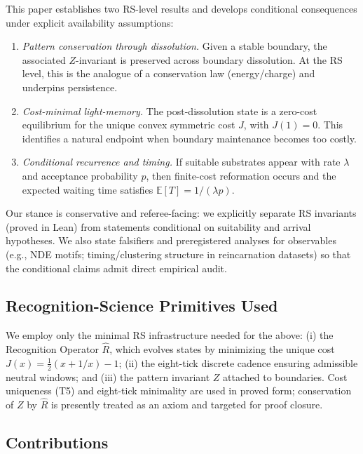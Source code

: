 \documentclass[11pt,letterpaper]{article}
\theoremstyle{definition}
\theoremstyle{remark}
\begin{document}
This paper establishes two RS-level results and develops conditional consequences under explicit availability assumptions:
\begin{enumerate}
  \item \emph{Pattern conservation through dissolution.} Given a stable boundary, the associated \(Z\)-invariant is preserved across boundary dissolution. At the RS level, this is the analogue of a conservation law (energy/charge) and underpins persistence.
  \item \emph{Cost-minimal light-memory.} The post-dissolution state is a zero-cost equilibrium for the unique convex symmetric cost \(J\), with \(J(1)=0\). This identifies a natural endpoint when boundary maintenance becomes too costly.
  \item \emph{Conditional recurrence and timing.} If suitable substrates appear with rate \(\lambda\) and acceptance probability \(p\), then finite-cost reformation occurs and the expected waiting time satisfies \(\mathbb{E}[T]=1/(\lambda p)\).
\end{enumerate}

Our stance is conservative and referee-facing: we explicitly separate RS invariants (proved in Lean) from statements conditional on suitability and arrival hypotheses. We also state falsifiers and preregistered analyses for observables (e.g., NDE motifs; timing/clustering structure in reincarnation datasets) so that the conditional claims admit direct empirical audit.

\subsection{Recognition-Science Primitives Used}

We employ only the minimal RS infrastructure needed for the above: (i) the Recognition Operator \(\widehat{R}\), which evolves states by minimizing the unique cost \(J(x)=\tfrac{1}{2}(x+1/x)-1\); (ii) the eight-tick discrete cadence ensuring admissible neutral windows; and (iii) the pattern invariant \(Z\) attached to boundaries. Cost uniqueness (T5) and eight-tick minimality are used in proved form; conservation of \(Z\) by \(\widehat{R}\) is presently treated as an axiom and targeted for proof closure.

\subsection{Contributions}
\end{document}
